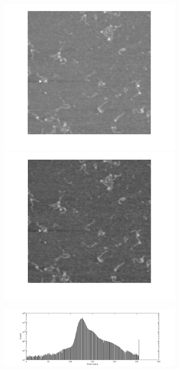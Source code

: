 \documentclass{article}
\begin{document}
\begin{figure}[htb!]
	\centering
	\begin{subfigure}{0.28\textwidth}
		\includegraphics[width=\linewidth]{beforeDenoise_img.png}

		\vspace{0.1cm}

		\includegraphics[width=\linewidth]{afterDenoise_img.png}
		\caption{}
		\label{fig:denoising_imgs}
	\end{subfigure}
	\begin{subfigure}{0.7\textwidth}
		\includegraphics[width=\linewidth]{beforeDenoise_histogram.png}


\end{subfigure}
\end{figure}
\end{document}
